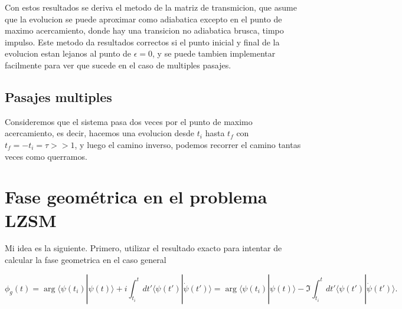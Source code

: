 Con estos resultados se deriva el metodo de la matriz de transmicion, que asume que la evolucion se puede aproximar como adiabatica excepto en el punto de maximo acercamiento, donde hay una transicion no adiabatica brusca, timpo impulso. Este metodo da resultados correctos si el punto inicial y final de la evolucion estan lejanos al punto de $\epsilon=0$, y se puede tambien implementar facilmente para ver que sucede en el caso de multiples pasajes.
\subsection{Pasajes multiples}
Consideremos que el sistema pasa dos veces por el punto de maximo acercamiento, es decir, hacemos una evolucion desde $t_i$ hasta $t_f$ con $t_f=-t_i=\tau >>1$, y luego el camino inverso, podemos recorrer el camino tantas veces como querramos.   
\section{Fase geométrica en el problema LZSM}

Mi idea es la siguiente. Primero, utilizar el resultado exacto para intentar de calcular la fase geometrica en el caso general

\begin{equation}
    \phi_g(t) = \arg\langle \psi(t_i)|\psi(t)\rangle + i \int_{t_i}^{t} dt' \langle \psi(t')|\dot{\psi}(t')\rangle = \arg\langle \psi(t_i)|\psi(t)\rangle - \Im \int_{t_i}^{t} dt' \langle \psi(t')|\dot{\psi}(t')\rangle.
\end{equation}

